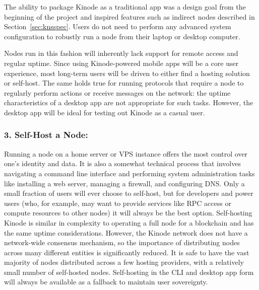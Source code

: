 \documentclass[runningheads]{llncs}
\begin{document}
The ability to package Kinode as a traditional app was a design goal from the beginning of the project and inspired features such as indirect nodes described in Section~\ref{sec:knsspec}.
Users do not need to perform any advanced system configuration to robustly run a node from their laptop or desktop computer.

Nodes run in this fashion will inherently lack support for remote access and regular uptime.
Since using Kinode-powered mobile apps will be a core user experience, most long-term users will be driven to either find a hosting solution or self-host.
The same holds true for running protocols that require a node to regularly perform actions or receive messages on the network: the uptime characteristics of a desktop app are not appropriate for such tasks.
However, the desktop app will be ideal for testing out Kinode as a casual user.

\subsubsection{3. Self-Host a Node:}

Running a node on a home server or VPS instance offers the most control over one's identity and data.
It is also a somewhat technical process that involves navigating a command line interface and performing system administration tasks like installing a web server, managing a firewall, and configuring DNS.
Only a small fraction of users will ever choose to self-host, but for developers and power users (who, for example, may want to provide services like RPC access or compute resources to other nodes) it will always be the best option.
Self-hosting Kinode is similar in complexity to operating a full node for a blockchain and has the same uptime considerations.
However, the Kinode network does not have a network-wide consensus mechanism, so the importance of distributing nodes across many different entities is significantly reduced.
It is safe to have the vast majority of nodes distributed across a few hosting providers, with a relatively small number of self-hosted nodes.
Self-hosting in the CLI and desktop app form will always be available as a fallback to maintain user sovereignty.
\end{document}
